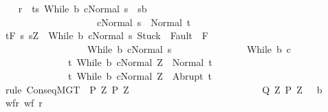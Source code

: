 \begin{isabellebody}
\ \ \isamarkupfalse%
\ {\isacharquery}r\ {\isacharequal}\ {\isachardoublequoteopen}{\isacharbraceleft}{\isacharparenleft}t{\isacharcomma}s{\isacharparenright}{\isachardot}\ {\isasymGamma}{\isasymturnstile}{\isacharparenleft}While\ b\ c{\isacharparenright}{\isasymdown}Normal\ s\ {\isasymand}\ s{\isasymin}b\ {\isasymand}\ \isanewline
\ \ \ \ \ \ \ \ \ \ \ \ \ \ \ \ \ \ \ \ {\isasymGamma}{\isasymturnstile}{\isasymlangle}c{\isacharcomma}Normal\ s{\isasymrangle}\ {\isasymRightarrow}\ Normal\ t{\isacharbraceright}{\isachardoublequoteclose}\isanewline
\ \ \isamarkupfalse%
\ {\isachardoublequoteopen}{\isasymGamma}{\isacharcomma}{\isasymTheta}{\isasymturnstile}\isactrlsub t\isactrlbsub {\isacharslash}F\isactrlesub \ {\isacharbraceleft}s{\isachardot}\ s{\isacharequal}Z\ {\isasymand}\ {\isasymGamma}{\isasymturnstile}{\isasymlangle}While\ b\ c{\isacharcomma}Normal\ s{\isasymrangle}\ {\isasymRightarrow}{\isasymnotin}{\isacharparenleft}{\isacharbraceleft}Stuck{\isacharbraceright}\ {\isasymunion}\ Fault\ {\isacharbackquote}\ {\isacharparenleft}{\isacharminus}F{\isacharparenright}{\isacharparenright}\ {\isasymand}\ \ \isanewline
\ \ \ \ \ \ \ \ \ \ \ \ \ \ \ \ \ \ {\isasymGamma}{\isasymturnstile}{\isacharparenleft}While\ b\ c{\isacharparenright}{\isasymdown}Normal\ s{\isacharbraceright}\ \isanewline
\ \ \ \ \ \ \ \ \ \ \ \ \ \ {\isacharparenleft}While\ b\ c{\isacharparenright}\isanewline
\ \ \ \ \ \ \ \ \ \ \ \ \ \ {\isacharbraceleft}t{\isachardot}\ {\isasymGamma}{\isasymturnstile}{\isasymlangle}While\ b\ c{\isacharcomma}Normal\ Z{\isasymrangle}\ {\isasymRightarrow}\ Normal\ t{\isacharbraceright}{\isacharcomma}\isanewline
\ \ \ \ \ \ \ \ \ \ \ \ \ \ {\isacharbraceleft}t{\isachardot}\ {\isasymGamma}{\isasymturnstile}{\isasymlangle}While\ b\ c{\isacharcomma}Normal\ Z{\isasymrangle}\ {\isasymRightarrow}\ Abrupt\ t{\isacharbraceright}{\isachardoublequoteclose}\isanewline
\ \ \isamarkupfalse%
\ {\isacharparenleft}rule\ ConseqMGT\ {\isacharbrackleft}\ {\isacharquery}P{\isacharprime}{\isacharequal}{\isachardoublequoteopen}{\isasymlambda}\ Z{\isachardot}\ {\isacharquery}P{\isacharprime}\ Z{\isachardoublequoteclose}\ \isanewline
\ \ \ \ \ \ \ \ \ \ \ \ \ \ \ \ \ \ \ \ \ \ \ \ \ \ {\isacharquery}Q{\isacharprime}{\isacharequal}{\isachardoublequoteopen}{\isasymlambda}\ Z{\isachardot}\ {\isacharquery}P{\isacharprime}\ Z\ {\isasyminter}\ {\isacharminus}\ b{\isachardoublequoteclose}{\isacharbrackright}{\isacharparenright}\isanewline
\ \ \ \ \isamarkupfalse%
\ wf{\isacharunderscore}r{\isacharcolon}\ {\isachardoublequoteopen}wf\ {\isacharquery}r{\isachardoublequoteclose}\ \isamarkupfalse%

\end{isabellebody}
